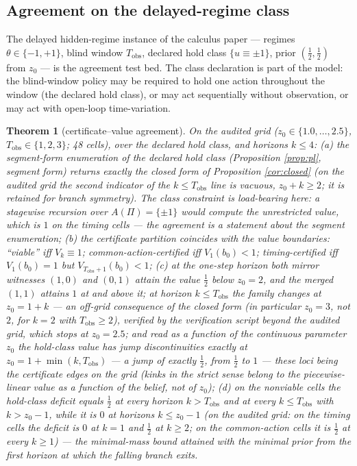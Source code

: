 \documentclass[10pt,twocolumn]{article}
\theoremstyle{plain}
\newtheorem{theorem}{Theorem}
\theoremstyle{definition}
\theoremstyle{remark}
\begin{document}
\subsection{Agreement on the delayed-regime class}\label{agreement}

The delayed hidden-regime instance of the calculus paper --- regimes
\(\theta \in \{-1, +1\}\), blind window \(T_{\mathrm{obs}}\), declared
hold class \(\{u \equiv \pm 1\}\), prior \((\tfrac12, \tfrac12)\) from
\(z_{0}\) --- is the agreement test bed. The class declaration is part of
the model: the blind-window policy may be required to hold one action
throughout the window (the declared hold class), or may act sequentially
without observation, or may act with open-loop time-variation.

\begin{theorem}[certificate--value agreement]\label{thm:agree}
On the audited grid (\(z_{0} \in \{1.0, \dots, 2.5\}\),
\(T_{\mathrm{obs}} \in \{1,2,3\}\); 48 cells), over the declared hold
class, and horizons \(k \le 4\):
(a) the segment-form enumeration of the declared hold class
(Proposition \ref{prop:pl}, segment form) returns exactly the closed
form of Proposition
\ref{cor:closed} (on the audited grid the second indicator of the
\(k \le T_{\mathrm{obs}}\) line is vacuous, \(z_{0} + k \ge 2\); it is
retained for branch symmetry). The class constraint is load-bearing
here: a stagewise recursion over \(A(\Pi) = \{\pm 1\}\) would compute
the unrestricted value, which is \(1\) on the timing cells --- the
agreement is a statement about the segment enumeration;
(b) the certificate partition coincides with the value boundaries:
``viable'' iff \(V_{k} \equiv 1\); common-action-certified iff
\(V_{1}(b_{0}) < 1\); timing-certified iff \(V_{1}(b_{0}) = 1\) but
\(V_{T_{\mathrm{obs}}+1}(b_{0}) < 1\);
(c) at the one-step horizon both mirror witnesses \((1,0)\) and
\((0,1)\) attain the value \(\tfrac{1}{2}\) below \(z_{0} = 2\), and
the merged \((1,1)\) attains \(1\) at and above it; at horizon
\(k \le T_{\mathrm{obs}}\) the family changes at \(z_{0} = 1 + k\) ---
an off-grid consequence of the closed form (in particular \(z_{0} = 3\),
not \(2\), for \(k = 2\) with \(T_{\mathrm{obs}} \ge 2\)), verified
by the verification script beyond the audited grid, which stops at
\(z_{0} = 2.5\); and read as a function of
the continuous parameter \(z_{0}\) the hold-class value has jump
discontinuities exactly at \(z_{0} = 1 + \min(k, T_{\mathrm{obs}})\) --- a
jump of exactly \(\tfrac{1}{2}\), from \(\tfrac{1}{2}\) to \(1\) --- these
loci being the certificate edges on the grid (kinks in the strict sense
belong to the piecewise-linear value as a function of the belief, not of
\(z_{0}\));
(d) on the nonviable cells the hold-class deficit equals
\(\tfrac{1}{2}\) at every horizon \(k > T_{\mathrm{obs}}\) and at
every \(k \le T_{\mathrm{obs}}\) with \(k > z_{0} - 1\), while it is
\(0\) at horizons \(k \le z_{0} - 1\) (on the audited grid: on the
timing cells the deficit is \(0\) at \(k = 1\) and \(\tfrac{1}{2}\)
at \(k \ge 2\); on the common-action cells it is \(\tfrac{1}{2}\) at
every \(k \ge 1\)) --- the minimal-mass bound attained with the
minimal prior from the first horizon at which the falling branch
exits.
\end{theorem}
\end{document}
